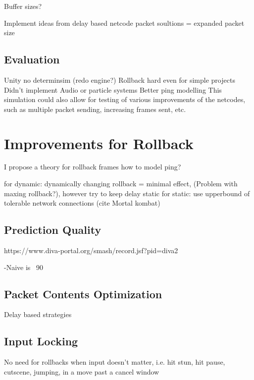 \documentclass{entcs}
\begin{document}
Buffer sizes?

Implement ideas from delay based netcode packet soultions = expanded packet size

\subsection{Evaluation}
Unity no determinsim (redo engine?)
Rollback hard even for simple projects
Didn't implement Audio or particle systems
Better ping modelling
This simulation could also allow for testing of various improvements of the netcodes, such as multiple packet sending, increasing frames sent, etc.

\section{Improvements for Rollback}

I propose a theory for rollback frames 
how to model ping?
%


for dynamic: dynamically changing rollback = minimal effect, (Problem with maxing rollback?), however try to keep delay static
for static: use upperbound of tolerable network connections (cite Mortal kombat)

\subsection{Prediction Quality}
https://www.diva-portal.org/smash/record.jsf?pid=diva2%

-Naive is ~90%
\subsection{Packet Contents Optimization}
Delay based strategies

\subsection{Input Locking}
No need for rollbacks when input doesn't matter, i.e. hit stun, hit pause, cutscene, jumping, in a move past a cancel window
\end{document}
